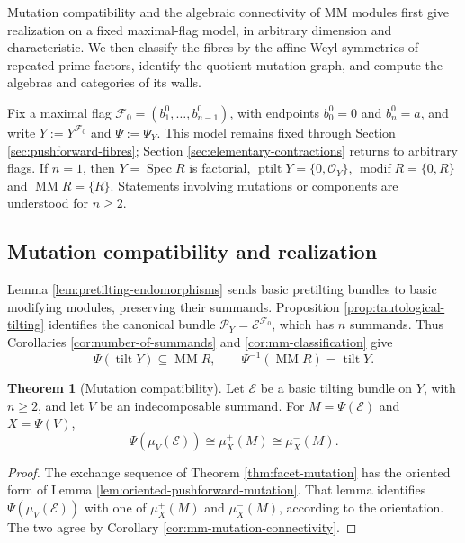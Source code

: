 \documentclass[a4paper,reqno]{amsart}
\def\E{\mathcal{E}}
\def\F{\mathcal{F}}
\def\O{\mathcal{O}}
\def\P{\mathcal{P}}
\DeclareMathOperator{\Spec}{Spec}
\DeclareMathOperator{\tilt}{tilt}
\DeclareMathOperator{\ptilt}{ptilt}
\DeclareMathOperator{\modif}{modif}
\DeclareMathOperator{\MM}{MM}
\theoremstyle{definition}
\newtheorem{Thm}{Theorem}[section]
\begin{document}
Mutation compatibility and the algebraic connectivity of MM modules first give realization on a fixed maximal-flag model, in arbitrary dimension and characteristic. We then classify the fibres by the affine Weyl symmetries of repeated prime factors, identify the quotient mutation graph, and compute the algebras and categories of its walls.

Fix a maximal flag $\F_0=(b_1^0,\ldots,b_{n-1}^0)$, with endpoints $b_0^0=0$ and $b_n^0=a$, and write $Y:=Y^{\F_0}$ and $\Psi:=\Psi_Y$. This model remains fixed through Section \ref{sec:pushforward-fibres}; Section \ref{sec:elementary-contractions} returns to arbitrary flags. If $n=1$, then $Y=\Spec R$ is factorial, $\ptilt Y=\{0,\O_Y\}$, $\modif R=\{0,R\}$ and $\MM R=\{R\}$. Statements involving mutations or components are understood for $n\ge2$.

\subsection{Mutation compatibility and realization}\label{sec:fixed-model-realization}\label{sec:mma-derived-equivalence}\label{sec:mutation-compatibility}

Lemma \ref{lem:pretilting-endomorphisms} sends basic pretilting bundles to basic modifying modules, preserving their summands. Proposition \ref{prop:tautological-tilting} identifies the canonical bundle $\P_Y=\E^{\F_0}$, which has $n$ summands. Thus Corollaries \ref{cor:number-of-summands} and \ref{cor:mm-classification} give
\[
\Psi(\tilt Y)\subseteq\MM R,\qquad
\Psi^{-1}(\MM R)=\tilt Y.
\]

\begin{Thm}[Mutation compatibility]\label{thm:pushforward-mutation}\label{prop:pushforward-mutation}
Let $\E$ be a basic tilting bundle on $Y$, with $n\ge2$, and let $V$ be an indecomposable summand. For $M=\Psi(\E)$ and $X=\Psi(V)$,
\begin{equation}\label{eq:pushforward-mutation-compatibility}
\Psi(\mu_V(\E))\cong\mu_X^+(M)\cong\mu_X^-(M).
\end{equation}
\end{Thm}
\begin{proof}
The exchange sequence of Theorem \ref{thm:facet-mutation} has the oriented form of Lemma \ref{lem:oriented-pushforward-mutation}. That lemma identifies $\Psi(\mu_V(\E))$ with one of $\mu_X^+(M)$ and $\mu_X^-(M)$, according to the orientation. The two agree by Corollary \ref{cor:mm-mutation-connectivity}.
\end{proof}
\end{document}
